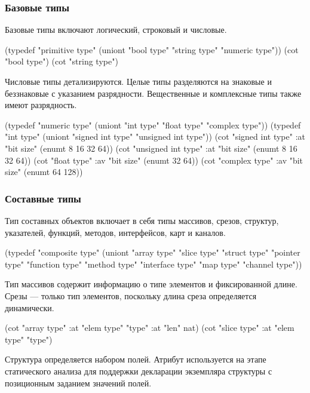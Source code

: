 \documentclass[12pt,twoside,russian]{article}
\newcommand{\textABMLString}[1]{{\color{abmlString}#1}}
\newcommand{\ABMLString}[1]{\abmlinline{\textABMLString{#1}}}
\begin{document}
\subsubsection{Базовые типы}
Базовые типы включают логический, строковый и числовые.

\begin{ABMLCode}
(typedef "primitive type" (uniont "bool type" "string type" 
                                  "numeric type"))
(cot "bool type")
(cot "string type")
\end{ABMLCode}

Числовые типы детализируются. Целые типы разделяются на знаковые и беззнаковые 
с указанием разрядности. Вещественные и комплексные типы также имеют разрядность.

\begin{ABMLCode}
(typedef "numeric type"  (uniont "int type" "float type" "complex type"))
(typedef "int type"      (uniont "signed int type" "unsigned int type"))
(cot "signed int type"   :at "bit size" (enumt 8 16 32 64))
(cot "unsigned int type" :at "bit size" (enumt 8 16 32 64))
(cot "float type"        :av "bit size" (enumt 32 64))
(cot "complex type"      :av "bit size" (enumt 64 128))
\end{ABMLCode}

\subsubsection{Составные типы}
Тип составных объектов включает в себя типы массивов, срезов, структур, указателей, функций, методов, интерфейсов, карт и каналов.

\begin{ABMLCode}
(typedef "composite type" 
    (uniont "array type" "slice type" "struct type" 
            "pointer type" "function type" "method type"
            "interface type" "map type" "channel type"))
\end{ABMLCode}

Тип массивов содержит информацию о типе элементов и фиксированной длине. Срезы — только тип элементов, поскольку длина среза определяется динамически.

\begin{ABMLCode}
(cot "array type" :at "elem type" "type" :at "len" nat)
(cot "slice type" :at "elem type" "type")
\end{ABMLCode}

Структура определяется набором полей. Атрибут \ABMLString{ordered} используется 
на этапе статического анализа для поддержки декларации экземпляра структуры с позиционным заданием значений полей.
\end{document}
